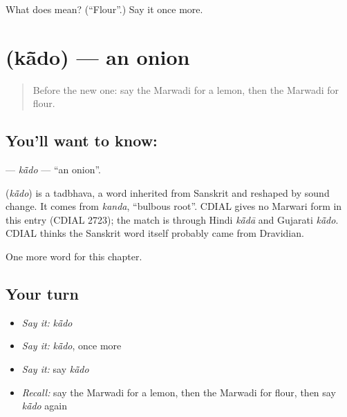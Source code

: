 \begin{tcolorbox}[breakable,colback=teal!4,colframe=teal!35!black,title={Before you move on}]
What does  mean? (\textquotedblleft{}Flour\textquotedblright{}.) Say it once more.
\end{tcolorbox}
\section[\texorpdfstring{\mw{कांदो} (kā̃do)}{कांदो (kā̃do)}]{ (kā̃do) — an onion}

\label{lesson:MW-C61-kado}



\begin{quote}
Before the new one: say the Marwadi for a lemon, then the Marwadi for flour.
\end{quote}

\subsection*{You'll want to know: }
\textbf{} — \emph{kā̃do} — \textquotedblleft{}an onion\textquotedblright{}.

\begin{cousinweb}
\textbf{} (\emph{kā̃do}) is a tadbhava, a word inherited from Sanskrit and reshaped by sound change. It comes from \emph{kanda}, \textquotedblleft{}bulbous root\textquotedblright{}. CDIAL gives no Marwari form in this entry (CDIAL 2723); the match is through Hindi \emph{kā̃dā} and Gujarati \emph{kā̃do}. CDIAL thinks the Sanskrit word itself probably came from Dravidian.
\end{cousinweb}

\begin{grammarlens}[title={What you've built}]
One more word for this chapter.
\end{grammarlens}

\subsection*{Your turn}
\begin{itemize}
\raggedright
  \item \emph{Say it:} \emph{kā̃do}
  \item \emph{Say it:} \emph{kā̃do}, once more
  \item \emph{Say it:} say \emph{kā̃do}
  \item \emph{Recall:} say the Marwadi for a lemon, then the Marwadi for flour, then say \emph{kā̃do} again
\end{itemize}

